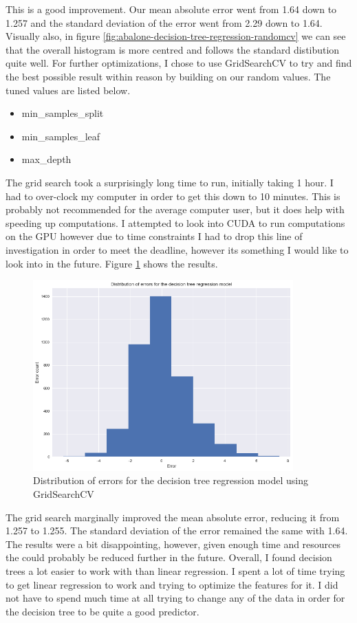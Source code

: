 This is a good improvement. Our mean absolute error went from 1.64 down to 1.257 and the standard deviation of the error went from 2.29 down to 1.64. Visually also, in figure \ref{fig:abalone-decision-tree-regression-randomcv} we can see that the overall histogram is more centred and follows the standard distibution quite well. 
For further optimizations, I chose to use GridSearchCV to try and find the best possible result within reason by building on our random values. The tuned values are listed below.

\begin{itemize}
  \item min\_samples\_split
  \item min\_samples\_leaf
  \item max\_depth
\end{itemize}

The grid search took a surprisingly long time to run, initially taking 1 hour. I had to over-clock my computer in order to get this down to 10 minutes. This is probably not recommended for the average computer user, but it does help with speeding up computations. I attempted to look into CUDA to run computations on the GPU\cite{6024507} however due to time constraints I had to drop this line of investigation in order to meet the deadline, however its something I would like to look into in the future. Figure \ref{fig:abalone-decision-tree-regression-gridcv} shows the results. 

\begin{figure}[H]
  \centering
  \includegraphics[scale=0.5,width=100mm]{./images/abalone-decision-tree-regression-gridcv.png}
  \caption{Distribution of errors for the decision tree regression model using GridSearchCV}
  \label{fig:abalone-decision-tree-regression-gridcv}
\end{figure}

The grid search marginally improved the mean absolute error, reducing it from 1.257 to 1.255. The standard deviation of the error remained the same with 1.64. The results were a bit disappointing, however, given enough time and resources the could probably be reduced further in the future.
Overall, I found decision trees a lot easier to work with than linear regression. I spent a lot of time trying to get linear regression to work and trying to optimize the features for it. I did not have to spend much time at all trying to change any of the data in order for the decision tree to be quite a good predictor.